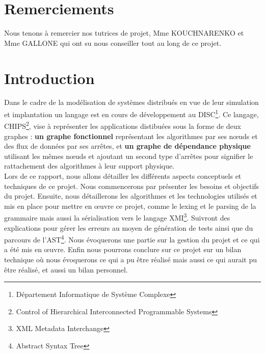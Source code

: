 \documentclass[a4paper, 11pt]{article}
\begin{document}


\thispagestyle{empty}
\clearpage

\newpage

\section*{Remerciements}

Nous tenons à remercier nos tutrices de projet, Mme \textsc{KOUCHNARENKO} et Mme \textsc{GALLONE} 
qui ont su nous conseiller tout au long de ce projet.

\newpage

\newpage
\tableofcontents %
\newpage

\newpage
\setcounter{page}{1} %

\section{Introduction}

Dans le cadre de la modélisation de systèmes distribués en vue de leur simulation et implantation un langage est en cours de développement au DISC\footnote{Département Informatique de Système Complexe}. Ce langage, CHIPS\footnote{Control of Hierarchical Interconnected Programmable Systems}, vise à représenter les applications distibuées sous la forme de deux graphes : \textbf{un graphe fonctionnel} représentant les algorithmes par ses nœuds et des flux de données par ses arrêtes, et \textbf{un graphe de dépendance physique} utilisant les mêmes nœuds et ajoutant un second type d'arrêtes pour signifier le rattachement des algorithmes à leur support physique. \\

Lors de ce rapport, nous allons détailler les différents aspects conceptuels et techniques de ce projet. Nous commencerons par présenter les besoins et objectifs du projet. Ensuite, nous détaillerons les algorithmes et les technologies utilisés et mis en place pour mettre en œuvre ce projet, comme le lexing et le parsing de la grammaire mais aussi la sérialisation vers le langage XMI\footnote{XML Metadata Interchange}. Suivront des explications pour gérer les erreurs au moyen de génération de tests ainsi que du parcours de l'AST\footnote{Abstract Syntax Tree}. Nous évoquerons une partie sur la gestion du projet et ce qui a été mis en œuvre. Enfin nous pourrons conclure sur ce projet sur un bilan technique où nous évoquerons ce qui a pu être réalisé mais aussi ce qui aurait pu être réalisé, et aussi un bilan personnel.
\end{document}
